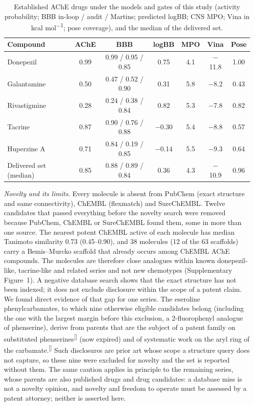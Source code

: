 \documentclass[11pt,a4paper]{article}
\renewcommand{\cite}[1]{\textsuperscript{[\citenum{#1}]}}
\begin{document}
\begin{table}[htb]
\centering\small
\caption{Established AChE drugs under the models and gates of this study (activity probability; BBB in-loop / audit / Martins; predicted logBB; CNS MPO; Vina in kcal mol\textsuperscript{$-$1}; pose coverage), and the median of the delivered set.}
\label{tab:refdrugs}
\begin{tabular}{@{}lcccccc@{}}
\toprule
\textbf{Compound} & \textbf{AChE} & \textbf{BBB} & \textbf{logBB} & \textbf{MPO} & \textbf{Vina} & \textbf{Pose} \\
\midrule
Donepezil & 0.99 & 0.99 / 0.95 / 0.85 & 0.75 & 4.1 & $-$11.8 & 1.00 \\
Galantamine & 0.50 & 0.47 / 0.52 / 0.90 & 0.31 & 5.8 & $-$8.2 & 0.43 \\
Rivastigmine & 0.28 & 0.24 / 0.38 / 0.84 & 0.82 & 5.3 & $-$7.8 & 0.82 \\
Tacrine & 0.87 & 0.90 / 0.76 / 0.88 & $-$0.30 & 5.4 & $-$8.8 & 0.57 \\
Huperzine A & 0.71 & 0.84 / 0.19 / 0.85 & $-$0.14 & 5.5 & $-$9.3 & 0.64 \\
\midrule
Delivered set (median) & 0.85 & 0.88 / 0.89 / 0.84 & 0.36 & 4.3 & $-$10.9 & 0.96 \\
\bottomrule
\end{tabular}
\end{table}
\textit{Novelty and its limits.} Every molecule is absent from PubChem (exact structure and same connectivity), ChEMBL (flexmatch) and SureChEMBL. Twelve candidates that passed everything before the novelty search were removed because PubChem, ChEMBL or SureChEMBL found them, some in more than one source. The nearest potent ChEMBL active of each molecule has median Tanimoto similarity 0.73 (0.45--0.90), and 38 molecules (12 of the 63 scaffolds) carry a Bemis--Murcko scaffold that already occurs among ChEMBL AChE compounds. The molecules are therefore close analogues within known donepezil-like, tacrine-like and related series and not new chemotypes (Supplementary Figure~1). A negative database search shows that the exact structure has not been indexed; it does not exclude disclosure within the scope of a patent claim. We found direct evidence of that gap for one series. The eseroline phenylcarbamates, to which nine otherwise eligible candidates belong (including the one with the largest margin before this exclusion, a 2-fluorophenyl analogue of phenserine), derive from parents that are the subject of a patent family on substituted phenserines\cite{greigpatent} (now expired) and of systematic work on the aryl ring of the carbamate.\cite{yu2001} Such disclosures are prior art whose scope a structure query does not capture, so these nine were excluded for novelty and the set is reported without them. The same caution applies in principle to the remaining series, whose parents are also published drugs and drug candidates: a database miss is not a novelty opinion, and novelty and freedom to operate must be assessed by a patent attorney; neither is asserted here.
\end{document}
